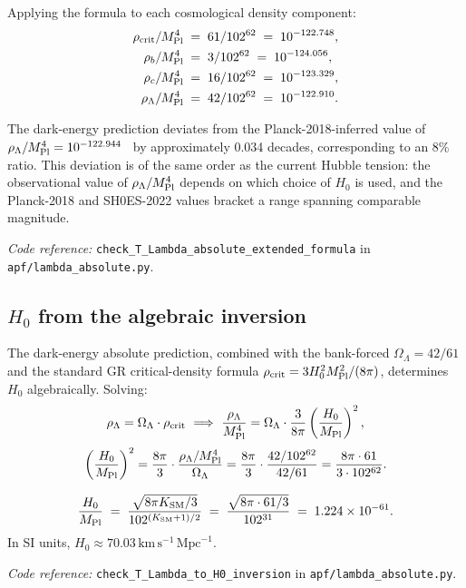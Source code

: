 \documentclass[11pt]{article}
\newcommand{\coderef}[2]{\smallskip\noindent\textit{Code reference:} \texttt{#1} in \texttt{#2}.}
\newcommand{\Mpl}{M_{\rm Pl}}
\begin{document}
Applying the formula to each cosmological density component:
\begin{align*}
\rho_{\rm crit}    / \Mpl^4 \;&=\; 61/102^{62}  \;=\; 10^{-122.748}, \\
\rho_b             / \Mpl^4 \;&=\; 3/102^{62}   \;=\; 10^{-124.056}, \\
\rho_c             / \Mpl^4 \;&=\; 16/102^{62}  \;=\; 10^{-123.329}, \\
\rho_\Lambda       / \Mpl^4 \;&=\; 42/102^{62}  \;=\; 10^{-122.910}.
\end{align*}

The dark-energy prediction deviates from the Planck-2018-inferred value of $\rho_\Lambda/\Mpl^4 = 10^{-122.944}$~\cite{Planck2018} by approximately 0.034 decades, corresponding to an 8\% ratio. This deviation is of the same order as the current Hubble tension: the observational value of $\rho_\Lambda/\Mpl^4$ depends on which choice of $H_0$ is used, and the Planck-2018 and SH0ES-2022 values bracket a range spanning comparable magnitude.

\coderef{check\_T\_Lambda\_absolute\_extended\_formula}{apf/lambda\_absolute.py}

\subsection{$H_0$ from the algebraic inversion}\label{sec:cosmology_H0}

The dark-energy absolute prediction, combined with the bank-forced $\Omega_\Lambda = 42/61$ and the standard GR critical-density formula $\rho_{\rm crit} = 3 H_0^2 \Mpl^2/(8\pi)$, determines $H_0$ algebraically. Solving:
\[
\rho_\Lambda = \Omega_\Lambda \cdot \rho_{\rm crit}
\ \Longrightarrow\
\frac{\rho_\Lambda}{\Mpl^4} = \Omega_\Lambda \cdot \frac{3}{8\pi} \left(\frac{H_0}{\Mpl}\right)^2,
\]
\[
\left(\frac{H_0}{\Mpl}\right)^2 = \frac{8\pi}{3} \cdot \frac{\rho_\Lambda/\Mpl^4}{\Omega_\Lambda} = \frac{8\pi}{3} \cdot \frac{42/102^{62}}{42/61} = \frac{8\pi \cdot 61}{3 \cdot 102^{62}}.
\]

\begin{tcolorbox}[apfbox, title={APF prediction for the Hubble constant}]
\[
\frac{H_0}{\Mpl} \;=\; \frac{\sqrt{8\pi K_{\rm SM}/3}}{102^{(K_{\rm SM}+1)/2}} \;=\; \frac{\sqrt{8\pi \cdot 61/3}}{102^{31}} \;=\; 1.224 \times 10^{-61}.
\]
In SI units, $H_0 \approx 70.03\,\mathrm{km}\,\mathrm{s}^{-1}\,\mathrm{Mpc}^{-1}$.
\end{tcolorbox}

\coderef{check\_T\_Lambda\_to\_H0\_inversion}{apf/lambda\_absolute.py}
\end{document}
